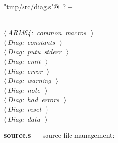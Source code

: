 \documentclass[11pt,a4paper,twoside,openright,DIV=15]{scrbook}
\theoremstyle{definition}
\theoremstyle{plain}
\theoremstyle{remark}
\begin{document}
\begin{flushleft} \small
\begin{minipage}{\linewidth}\label{scrap93}\raggedright\small
{} \verb@"tmp/src/diag.s"@\nobreak\ {\footnotesize {?}}$\equiv$
\vspace{-1ex}
\begin{list}{}{} \item
\mbox{}\verb@@\\
\mbox{}\verb@@\hbox{$\langle\,${\itshape ARM64: common macros}\nobreak\ {\footnotesize {}}$\,\rangle$}\verb@@\\
\mbox{}\verb@@\hbox{$\langle\,${\itshape Diag: constants}\nobreak\ {\footnotesize {}}$\,\rangle$}\verb@@\\
\mbox{}\verb@@\hbox{$\langle\,${\itshape Diag: putu stderr}\nobreak\ {\footnotesize {}}$\,\rangle$}\verb@@\\
\mbox{}\verb@@\hbox{$\langle\,${\itshape Diag: emit}\nobreak\ {\footnotesize {}}$\,\rangle$}\verb@@\\
\mbox{}\verb@@\hbox{$\langle\,${\itshape Diag: error}\nobreak\ {\footnotesize {}}$\,\rangle$}\verb@@\\
\mbox{}\verb@@\hbox{$\langle\,${\itshape Diag: warning}\nobreak\ {\footnotesize {}}$\,\rangle$}\verb@@\\
\mbox{}\verb@@\hbox{$\langle\,${\itshape Diag: note}\nobreak\ {\footnotesize {}}$\,\rangle$}\verb@@\\
\mbox{}\verb@@\hbox{$\langle\,${\itshape Diag: had errors}\nobreak\ {\footnotesize {}}$\,\rangle$}\verb@@\\
\mbox{}\verb@@\hbox{$\langle\,${\itshape Diag: reset}\nobreak\ {\footnotesize {}}$\,\rangle$}\verb@@\\
\mbox{}\verb@@\hbox{$\langle\,${\itshape Diag: data}\nobreak\ {\footnotesize {}}$\,\rangle$}\verb@@\\
\mbox{}\verb@@{\NWsep}
\end{list}
\vspace{-1.5ex}
\footnotesize
\begin{list}{}{\setlength{\itemsep}{-\parsep}\setlength{\itemindent}{-\leftmargin}}

\item{}
\end{list}
\end{minipage}\vspace{4ex}
\end{flushleft}
\noindent\textbf{source.s} --- source file management:
\end{document}

